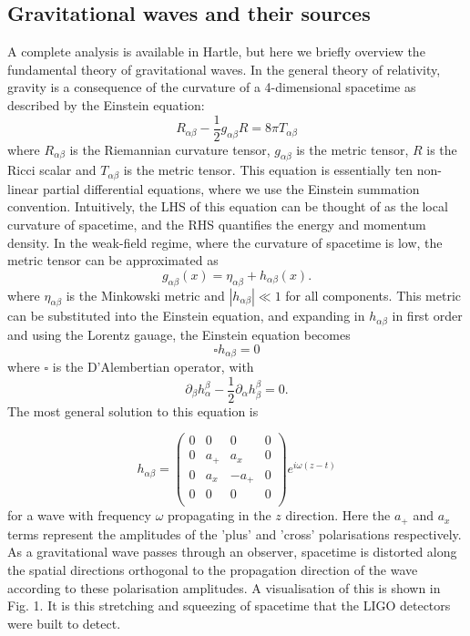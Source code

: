 \documentclass[]{article}
\begin{document}
\subsection{Gravitational waves and their sources}
A complete analysis is available in Hartle\cite{hartle}, but here we briefly overview the fundamental theory of gravitational waves. In the general theory of relativity, gravity is a consequence of the curvature of a 4-dimensional spacetime as described by the Einstein equation:
\begin{equation}
R_{\alpha\beta}-\frac{1}{2}g_{\alpha\beta}R=8\pi T_{\alpha\beta}
\end{equation}
where $R_{\alpha\beta}$ is the Riemannian curvature tensor, $g_{\alpha\beta}$ is the metric tensor, $R$ is the Ricci scalar and $T_{\alpha\beta}$ is the metric tensor. This equation is essentially ten non-linear partial differential equations, where we use the Einstein summation convention. Intuitively, the LHS of this equation can be thought of as the local curvature of spacetime, and the RHS quantifies the energy and momentum density. In the weak-field regime, where the curvature of spacetime is low, the metric tensor can be approximated as
\begin{equation}
g_{\alpha\beta}(x)=\eta_{\alpha\beta}+h_{\alpha\beta}(x).
\end{equation}
where $\eta_{\alpha\beta}$ is the Minkowski metric and $|h_{\alpha\beta}| \ll 1$ for all components. This metric can be substituted into the Einstein equation, and expanding in $h_{\alpha\beta}$ in first order and using the Lorentz gauage, the Einstein equation becomes
\begin{equation}
\square h_{\alpha\beta}=0
\end{equation}
where $\square$ is the D'Alembertian operator, with
\begin{equation}
\partial_\beta h^\beta_\alpha-\frac{1}{2}\partial_\alpha h^\beta_\beta=0.
\end{equation}
The most general solution to this equation is

\begin{equation}
h_{\alpha\beta}=
\begin{pmatrix}
0 & 0 & 0 & 0\\
0 & a_+ & a_x & 0\\
0 & a_x & -a_+ & 0\\
0 & 0 & 0 & 0\\
\end{pmatrix}
e^{i\omega(z-t)}
\end{equation}
for a wave with frequency $\omega$ propagating in the $z$ direction. Here the $a_+$ and $a_x$ terms represent the amplitudes of the 'plus' and 'cross' polarisations respectively. As a gravitational wave passes through an observer, spacetime is distorted along the spatial directions orthogonal to the propagation direction of the wave according to these polarisation amplitudes. A visualisation of this is shown in Fig. 1. It is this stretching and squeezing of spacetime that the LIGO detectors were built to detect.
\end{document}
